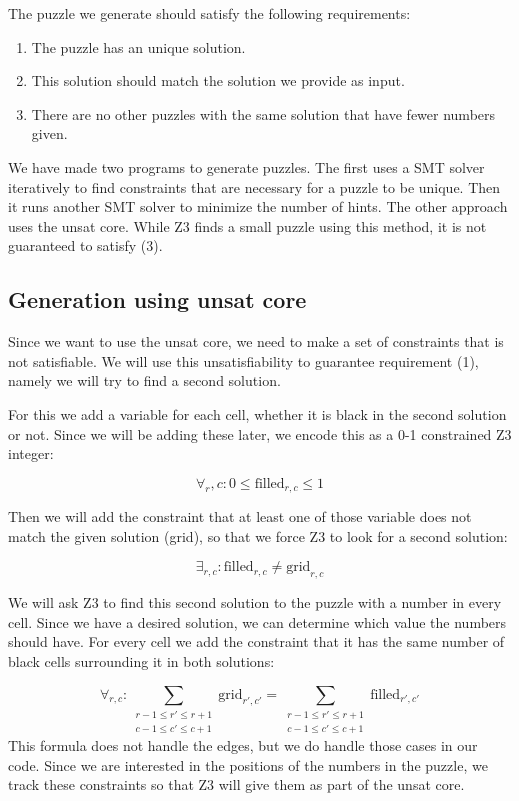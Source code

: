 \documentclass{scrartcl}
\begin{document}
	The puzzle we generate should satisfy the following requirements:
	\begin{enumerate}
		\item The puzzle has an unique solution.
		\item This solution should match the solution we provide as input.
		\item There are no other puzzles with the same solution that have fewer numbers given.
	\end{enumerate}

	We have made two programs to generate puzzles.
	The first uses a SMT solver iteratively to find constraints that are necessary for a puzzle to be unique. Then it runs another SMT solver to minimize the number of hints. The other approach uses the unsat core. While Z3 finds a small puzzle using this method, it is not guaranteed to satisfy (3).

	\subsection{Generation using unsat core} %
	\label{sub:mosaic_unsat_core}
	Since we want to use the unsat core, we need to make a set of constraints that is not satisfiable. We will use this unsatisfiability to guarantee requirement (1), namely we will try to find a second solution.

	For this we add a variable for each cell, whether it is black in the second solution or not. Since we will be adding these later, we encode this as a 0-1 constrained Z3 integer:

	$$\forall_r,c:  0 \le \text{filled}_{r,c} \le 1$$

	Then we will add the constraint that at least one of those variable does not match the given solution (grid), so that we force Z3 to look for a second solution:

	$$\exists_{r,c}:  \text{filled}_{r,c} \ne \text{grid}_{r,c}$$

	We will ask Z3 to find this second solution to the puzzle with a number in every cell. Since we have a desired solution, we can determine which value the numbers should have. For every cell we add the constraint that it has the same number of black cells surrounding it in both solutions:

	$$\forall_{r,c}: \sum_{\substack{r-1\le r' \le r+1\\c-1\le c'\le c+1}}\text{grid}_{r',c'} = \sum_{\substack{r-1\le r' \le r+1\\c-1\le c'\le c+1}}\text{filled}_{r',c'}$$
	This formula does not handle the edges, but we do handle those cases in our code. Since we are interested in the positions of the numbers in the puzzle, we track these constraints so that Z3 will give them as part of the unsat core.
\end{document}
